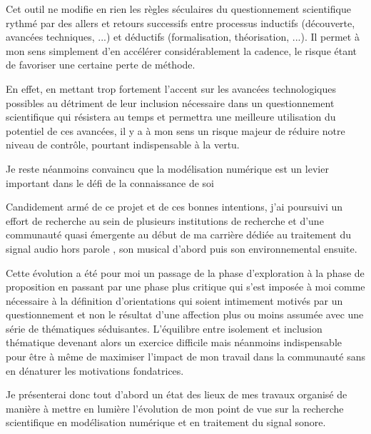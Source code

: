   Cet outil ne modifie en rien les règles séculaires du questionnement scientifique rythmé par des allers et retours successifs entre processus inductifs (découverte, avancées techniques, ...) et déductifs (formalisation, théorisation, ...). Il permet à mon sens simplement d'en accélérer considérablement la cadence, le risque étant de favoriser une certaine perte de méthode.

  En effet, en mettant trop fortement l'accent sur les avancées technologiques possibles au détriment de leur inclusion nécessaire dans un questionnement scientifique qui résistera au temps et permettra une meilleure utilisation du potentiel de ces avancées, il y a à mon sens un risque majeur de réduire notre niveau de contrôle, pourtant indispensable à la vertu.

  Je reste néanmoins convaincu que la modélisation numérique est un levier important dans le défi de la connaissance de soi

  Candidement armé de ce projet et de ces bonnes intentions, j'ai poursuivi un effort de recherche au sein de plusieurs institutions de recherche et d'une communauté quasi émergente au début de ma carrière dédiée au traitement du signal audio \og hors parole \fg, son musical d'abord puis son environnemental ensuite. %

  Cette évolution a été pour moi un passage de la phase d'exploration à la phase de proposition en passant par une phase plus critique qui s'est imposée à moi comme nécessaire à la définition d'orientations qui soient intimement motivés par un questionnement et non le résultat d'une affection plus ou moins assumée avec une série de thématiques séduisantes. L'équilibre entre isolement et inclusion thématique devenant alors un exercice difficile mais néanmoins indispensable pour être à même de maximiser l'impact de mon travail dans la communauté sans en dénaturer les motivations fondatrices.

  Je présenterai donc tout d'abord un état des lieux de mes travaux organisé de manière à mettre en lumière l'évolution de mon point de vue sur la recherche scientifique en modélisation numérique et en traitement du signal sonore. %

